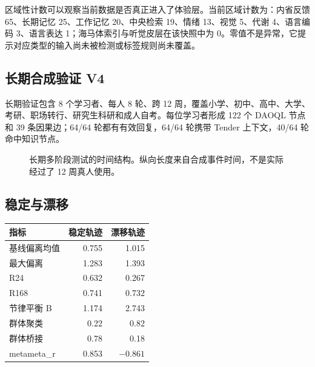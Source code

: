 \documentclass[UTF8,a4paper,11pt]{ctexart}
\begin{document}
区域性计数可以观察当前数据是否真正进入了体验层。当前区域计数为：内省反馈 65、长期记忆 25、工作记忆 20、中央检索 19、情绪 13、视觉 5、代谢 4、语言编码 3、语言表达 1；海马体索引与听觉皮层在该快照中为 0。零值不是异常，它提示对应类型的输入尚未被检测或标签规则尚未覆盖。

\subsection{长期合成验证 V4}

长期验证包含 8 个学习者、每人 8 轮、跨 12 周，覆盖小学、初中、高中、大学、考研、职场转行、研究生科研和成人自考。每位学习者形成 122 个 DAOQL 节点和 39 条因果边；64/64 轮都有有效回复，64/64 轮携带 Tender 上下文，40/64 轮命中知识节点。

\begin{figure}[htbp]
\centering
{}
\caption{长期多阶段测试的时间结构。纵向长度来自合成事件时间，不是实际经过了 12 周真人使用。}
\end{figure}

\subsection{稳定与漂移}

\begin{center}
\begin{longtable}{@{}lrr@{}}
\toprule
\textbf{指标} & \textbf{稳定轨迹} & \textbf{漂移轨迹} \\
\midrule
基线偏离均值 & 0.755 & 1.015 \\
最大偏离 & 1.283 & 1.393 \\
R24 & 0.632 & 0.267 \\
R168 & 0.741 & 0.732 \\
节律平衡 B & 1.174 & 2.743 \\
群体聚类 & 0.22 & 0.82 \\
群体桥接 & 0.78 & 0.18 \\
metameta\_r & 0.853 & \(-0.861\) \\
\bottomrule
\end{longtable}
\end{center}
\end{document}

